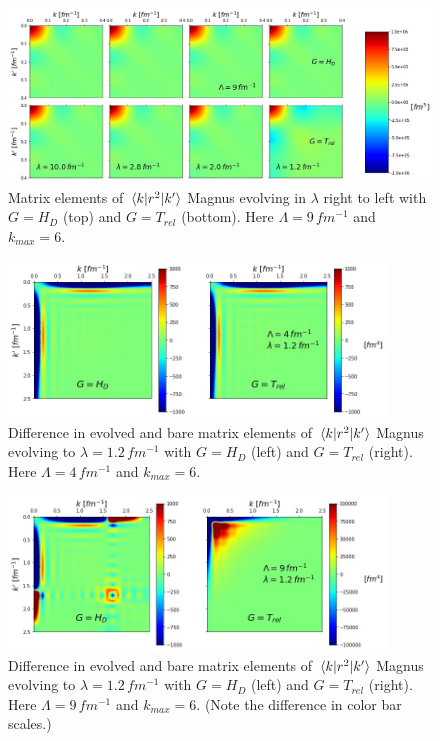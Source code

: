 \documentclass[preprintnumbers,floatfix,aps,prc,preprint,nofootinbib]{revtex4-1}
\begin{document}
\begin{figure}[H]
  \captionsetup{singlelinecheck=false,justification=raggedright}
  \centering
  \includegraphics[width=14cm]{r2_operator_contours_magnus_Wendt_Lamb9}
  \hspace*{0.05\textwidth}
  \caption{Matrix elements of $\mel{k}{r^2}{k'}$ Magnus evolving in $\lambda$ right to left with $G=H_D$ (top) and $G=T_{rel}$ (bottom). Here $\Lambda=9 \, fm^{-1}$ and $k_{max}=6$.}
  \label{fig:r2_operator_contours_srg_Wendt_Lamb9}
\end{figure}
%
\begin{figure}[H]
  \captionsetup{singlelinecheck=false,justification=raggedright}
  \centering
  \includegraphics[width=10cm]{r2_difference_magnus_Wendt_Lamb4}
  \hspace*{0.05\textwidth}
  \caption{Difference in evolved and bare matrix elements of $\mel{k}{r^2}{k'}$ Magnus evolving to $\lambda=1.2 \, fm^{-1}$ with $G=H_D$ (left) and $G=T_{rel}$ (right). Here $\Lambda=4 \, fm^{-1}$ and $k_{max}=6$.}
  \label{fig:r2_difference_magnus_Wendt_Lamb4}
\end{figure}
%
\begin{figure}[H]
  \captionsetup{singlelinecheck=false,justification=raggedright}
  \centering
  \includegraphics[width=10cm]{r2_difference_magnus_Wendt_Lamb9}
  \hspace*{0.05\textwidth}
  \caption{Difference in evolved and bare matrix elements of $\mel{k}{r^2}{k'}$ Magnus evolving to $\lambda=1.2 \, fm^{-1}$ with $G=H_D$ (left) and $G=T_{rel}$ (right). Here $\Lambda=9 \, fm^{-1}$ and $k_{max}=6$. (Note the difference in color bar scales.)}
  \label{fig:r2_difference_magnus_Wendt_Lamb9}
\end{figure}
\end{document}
